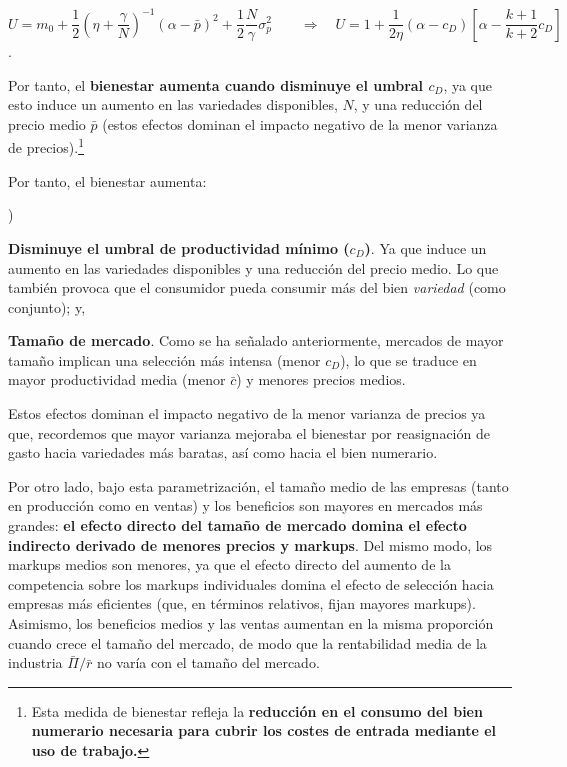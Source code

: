 \documentclass[10pt,a4paper]{article}
\newcounter{alphaitem}
\newenvironment{la}
      {\begin{list}{\alph{alphaitem})}{%
          \usecounter{alphaitem}%
          \setlength{\leftmargin}{1cm}%
          \setlength{\parskip}{3pt}%
          \setlength{\itemsep}{0pt}%
          \setlength{\parsep}{0pt}%
      }}
      {\end{list}}
\begin{document}
$$U = m_0 + \frac{1}{2} \left(\eta+\frac{\gamma}{N}\right)^{-1} (\alpha - \bar{p})^2 + \frac{1}{2} \frac{N}{\gamma} \sigma_p^2\qquad \Longrightarrow\quad U = 1 + \frac{1}{2\eta} (\alpha - c_D)\left[\alpha - \frac{k + 1}{k + 2} c_D\right]$$.

Por tanto, el \textbf{bienestar aumenta cuando disminuye el umbral $c_D$}, ya que esto induce un aumento en las variedades disponibles, $N$, y una reducción del precio medio $\bar{p}$ (estos efectos dominan el impacto negativo de la menor varianza de precios).\footnote{%
    Esta medida de bienestar refleja la \textbf{reducción en el consumo del bien numerario necesaria para cubrir los costes de entrada mediante el uso de trabajo.}
}

Por tanto, el bienestar aumenta:
\begin{la}
    \item \textbf{Disminuye el umbral de productividad mínimo ($c_D$)}. Ya que induce un aumento en las variedades disponibles y una reducción del precio medio. Lo que también provoca que el consumidor pueda consumir más del bien \textit{variedad} (como conjunto); y,
    \item \textbf{Tamaño de mercado}. Como se ha señalado anteriormente, mercados de mayor tamaño implican una selección más intensa (menor $c_D$), lo que se traduce en mayor productividad media (menor $\bar{c}$) y menores precios medios.
\end{la}

Estos efectos dominan el impacto negativo de la menor varianza de precios ya que, recordemos que mayor varianza mejoraba el bienestar por reasignación de gasto hacia variedades más baratas, así como hacia el bien numerario. 

Por otro lado, bajo esta parametrización, el tamaño medio de las empresas (tanto en producción como en ventas) y los beneficios son mayores en mercados más grandes: \textbf{el efecto directo del tamaño de mercado domina el efecto indirecto derivado de menores precios y markups}. Del mismo modo, los markups medios son menores, ya que el efecto directo del aumento de la competencia sobre los markups individuales domina el efecto de selección hacia empresas más eficientes (que, en términos relativos, fijan mayores markups). Asimismo, los beneficios medios y las ventas aumentan en la misma proporción cuando crece el tamaño del mercado, de modo que la rentabilidad media de la industria $\bar{\Pi}/\bar{r}$ no varía con el tamaño del mercado. 
\end{document}
